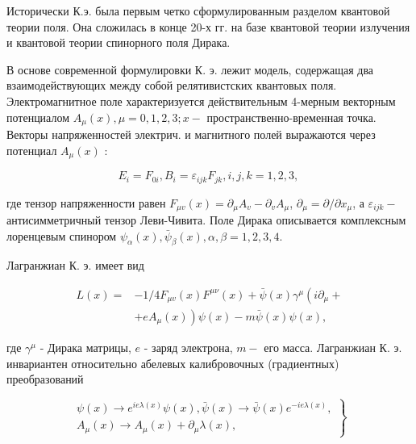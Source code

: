 \documentclass[10pt]{article}
\begin{document}
Исторически К.э. была первым четко сформулированным разделом квантовой теории поля. Она сложилась в конце 20-х гг. на базе квантовой теории излучения и квантовой теории спинорного поля Дирака.



В основе современной формулировки К. э. лежит модель, содержащая два взаимодействующих между собой релятивистских квантовых поля. Электромагнитное поле характеризуется действительным 4-мерным векторным потенциалом $A_{\mu}(x), \mu=0,1,2,3 ; x-$ пространственно-временная точка. Векторы напряженностей электрич. и магнитного полей выражаются через потенциал $A_{\mu}(x)$ :



\[

E_{i}=F_{0 i}, B_{i}=\varepsilon_{i j k} F_{j k}, i, j, k=1,2,3 \text {, }

\]



где тензор напряженности равен $F_{\mu v}(x)=\partial_{\mu} A_{v}-\partial_{v} A_{\mu}$, $\partial_{\mu}=\partial / \partial x_{\mu}$, а $\varepsilon_{i j k}-$ антисимметричный тензор Леви-Чивита. Поле Дирака описывается комплексным лоренцевым спинором $\psi_{\alpha}(x), \bar{\psi}_{\beta}(x), \alpha, \beta=1,2,3,4$.



Лагранжиан К. э. имеет вид



\[

\begin{aligned}

L(x)= & -1 / 4 F_{\mu v}(x) F^{\mu \nu}(x)+\bar{\psi}(x) \gamma^{\mu}\left(i \partial_{\mu}+\right. \\

& \left.+e A_{\mu}(x)\right) \psi(x)-m \bar{\psi}(x) \psi(x),

\end{aligned}

\]



где $\gamma^{\mu}$ - Дирака матрицы, $e$ - заряд электрона, $m-$ его масса. Лагранжиан К. э. инвариантен относительно абелевых калибровочных (градиентных) преобразований



\[

\left.\begin{array}{c}

\psi(x) \rightarrow e^{i e \lambda(x)} \psi(x), \bar{\psi}(x) \rightarrow \bar{\psi}(x) e^{-i e \lambda(x)}, \\

A_{\mu}(x) \rightarrow A_{\mu}(x)+\partial_{\mu} \lambda(x),

\end{array}\right\}

\]
\end{document}
